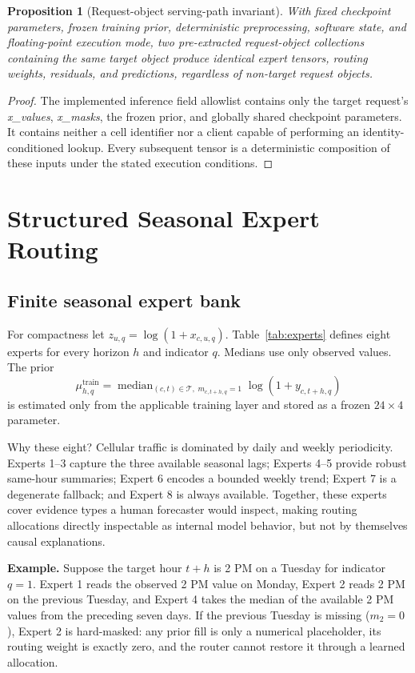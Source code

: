 \documentclass[10pt,conference,letterpaper]{IEEEtran}
\newtheorem{proposition}{Proposition}
\begin{document}
\begin{proposition}[Request-object serving-path invariant]
With fixed checkpoint parameters, frozen training prior, deterministic preprocessing, software state, and floating-point execution mode, two pre-extracted request-object collections containing the same target object produce identical expert tensors, routing weights, residuals, and predictions, regardless of non-target request objects.
\end{proposition}
\begin{proof}
The implemented inference field allowlist contains only the target request's \textit{x\_values}, \textit{x\_masks}, the frozen prior, and globally shared checkpoint parameters. It contains neither a cell identifier nor a client capable of performing an identity-conditioned lookup. Every subsequent tensor is a deterministic composition of these inputs under the stated execution conditions.
\end{proof}

\section{Structured Seasonal Expert Routing}
\subsection{Finite seasonal expert bank}
For compactness let $z_{u,q}=\log(1+x_{c,u,q})$. Table~\ref{tab:experts} defines eight experts for every horizon $h$ and indicator $q$. Medians use only observed values. The prior
\begin{equation}
\mu^{\mathrm{train}}_{h,q}=
\operatorname{median}_{(c,t)\in\mathcal T,\;m_{c,t+h,q}=1}
\log(1+y_{c,t+h,q})
\end{equation}
is estimated only from the applicable training layer and stored as a frozen $24\times4$ parameter.

Why these eight? Cellular traffic is dominated by daily and weekly periodicity. Experts 1--3 capture the three available seasonal lags; Experts 4--5 provide robust same-hour summaries; Expert 6 encodes a bounded weekly trend; Expert 7 is a degenerate fallback; and Expert 8 is always available. Together, these experts cover evidence types a human forecaster would inspect, making routing allocations directly inspectable as internal model behavior, but not by themselves causal explanations.

\noindent\textbf{Example.} Suppose the target hour $t+h$ is 2 PM on a Tuesday for indicator $q=1$. Expert 1 reads the observed 2 PM value on Monday, Expert 2 reads 2 PM on the previous Tuesday, and Expert 4 takes the median of the available 2 PM values from the preceding seven days. If the previous Tuesday is missing ($m_2=0$), Expert 2 is hard-masked: any prior fill is only a numerical placeholder, its routing weight is exactly zero, and the router cannot restore it through a learned allocation.
\end{document}
